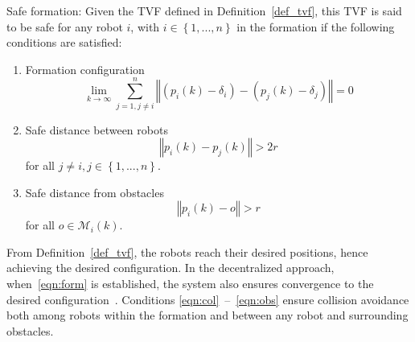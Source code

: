 \begin{definition}\label{def_pro}
Safe formation: Given the TVF defined in Definition~\ref{def_tvf}, this TVF is said to be safe for any robot $i$, with $i\in\left\{1,...,n\right\}$ in the formation if the following conditions are satisfied:
\begin{enumerate}
    \item Formation configuration
\begin{equation}
    \lim_{k\to\infty}\sum_{j=1,j\neq i}^n{\left\Vert\left(p_i(k)-\delta_i\right) - \left(p_j(k)-\delta_{j}\right)\right\Vert}=0
    \label{eqn:form}
\end{equation}
    \item Safe distance between robots
\begin{equation}
    \left\Vert p_i(k)-p_j(k)\right\Vert > 2r
    \label{eqn:col}
\end{equation}
for all $j\neq i, j\in\left\{1,...,n\right\}$.
    \item Safe distance from obstacles
\begin{equation}
    \left\Vert p_i(k)-o\right\Vert > r
    \label{eqn:obs}
\end{equation}
for all $o\in\mathcal{M}_i(k)$. 
\end{enumerate}
\end{definition}

\begin{remark}
From Definition~\ref{def_tvf}, the robots reach their desired positions, hence achieving the desired configuration. In the decentralized approach, when~\eqref{eqn:form} is established, the system also ensures convergence to the desired configuration~\cite{Dong2015}.
Conditions \eqref{eqn:col}~--~\eqref{eqn:obs} ensure collision avoidance both among robots within the formation and between any robot and surrounding obstacles.
\end{remark}

